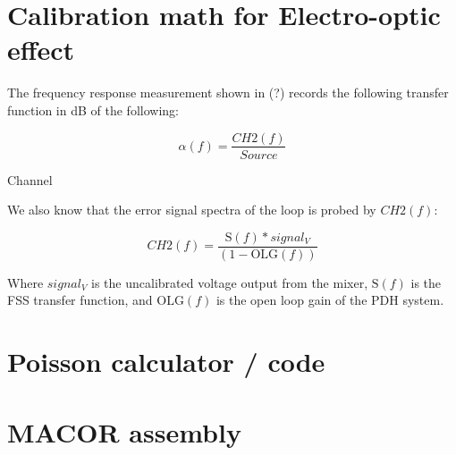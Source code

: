 
\section{Calibration math for Electro-optic effect}
The frequency response measurement shown in (?) records the following transfer function in dB of the following:

$$\alpha(f) = \frac{CH2(f)}{Source}$$

Channel

We also know that the error signal spectra of the loop is probed by $CH2(f)$:


$$ CH2(f) = \frac{\mathrm{S}(f)*signal_V}{(1-\mathrm{OLG}(f))}$$

Where $signal_V$ is the uncalibrated voltage output from the mixer, $\mathrm{S}(f)$ is the FSS transfer function, and $\mathrm{OLG}(f)$ is the open loop gain of the PDH system.


\section{Poisson calculator / code}

\section{MACOR assembly}
